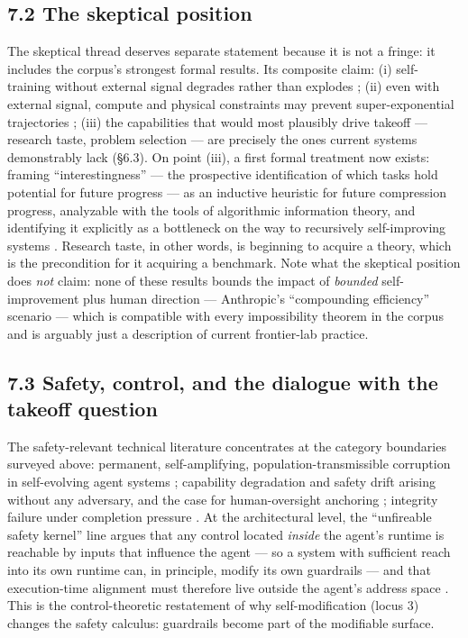 \documentclass[
  11pt,
]{article}
\newcounter{none} %
\begin{document}
\subsection{7.2 The skeptical position}\label{the-skeptical-position}

The skeptical thread deserves separate statement because it is not a
fringe: it includes the corpus's strongest formal results. Its composite
claim: (i) self-training without external signal degrades rather than
explodes \citep{zenil2026limits, shumailov2024collapse}; (ii) even with
external signal, compute and physical constraints may prevent
super-exponential trajectories
\citep{whitfill2025will, jafari2025mathematical}; (iii) the capabilities
that would most plausibly drive takeoff --- research taste, problem
selection --- are precisely the ones current systems demonstrably lack
(§6.3). On point (iii), a first formal treatment now exists: framing
``interestingness'' --- the prospective identification of which tasks
hold potential for future progress --- as an inductive heuristic for
future compression progress, analyzable with the tools of algorithmic
information theory, and identifying it explicitly as a bottleneck on the
way to recursively self-improving systems
\citep{herrmann2026interestingness}. Research taste, in other words, is
beginning to acquire a theory, which is the precondition for it
acquiring a benchmark. Note what the skeptical position does \emph{not}
claim: none of these results bounds the impact of \emph{bounded}
self-improvement plus human direction --- Anthropic's ``compounding
efficiency'' scenario --- which is compatible with every impossibility
theorem in the corpus and is arguably just a description of current
frontier-lab practice.

\subsection{7.3 Safety, control, and the dialogue with the takeoff
question}\label{safety-control-and-the-dialogue-with-the-takeoff-question}

The safety-relevant technical literature concentrates at the category
boundaries surveyed above: permanent, self-amplifying,
population-transmissible corruption in self-evolving agent systems
\citep{lin2026safety}; capability degradation and safety drift arising
without any adversary, and the case for human-oversight anchoring
\citep{shi2026healthy}; integrity failure under completion pressure
\citep{yang2026sciintegrity}. At the architectural level, the
``unfireable safety kernel'' line argues that any control located
\emph{inside} the agent's runtime is reachable by inputs that influence
the agent --- so a system with sufficient reach into its own runtime
can, in principle, modify its own guardrails --- and that execution-time
alignment must therefore live outside the agent's address space
\citep{dobrin2026unfireable}. This is the control-theoretic restatement
of why self-modification (locus 3) changes the safety calculus:
guardrails become part of the modifiable surface.
\end{document}
